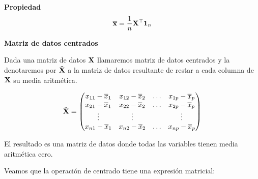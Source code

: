 \begin{frame}
\textbf{Propiedad} $$\overline{\mathbf{x}}=\frac{1}{n} \mathbf{X}^\top \mathbf{1}_n$$

\textbf{Matriz de datos centrados}

Dada una matriz de datos $\mathbf{X}$ llamaremos matriz de datos centrados y la denotaremos por $\tilde{\mathbf{X}}$ a la matriz de datos resultante de restar a cada columna de $\mathbf{X}$ su media aritmética.


$$\tilde{\mathbf{X}}=
\begin{pmatrix}
x_{1 1}- \overline{x}_1& x_{1 2}- \overline{x}_2 &\ldots & x_{1 p}- \overline{x}_p\\
x_{2 1} - \overline{x}_1& x_{2 2}- \overline{x}_2 &\ldots & x_{2 p}- \overline{x}_p\\
\vdots & \vdots   &       &\vdots\\ 
x_{n 1} - \overline{x}_1& x_{n 2}- \overline{x}_2 &\ldots & x_{n p}- \overline{x}_p
\end{pmatrix}$$

El resultado es una matriz de datos donde todas las variables tienen media aritmética cero.


Veamos que la operación de centrado tiene una expresión matricial:


\end{frame}

